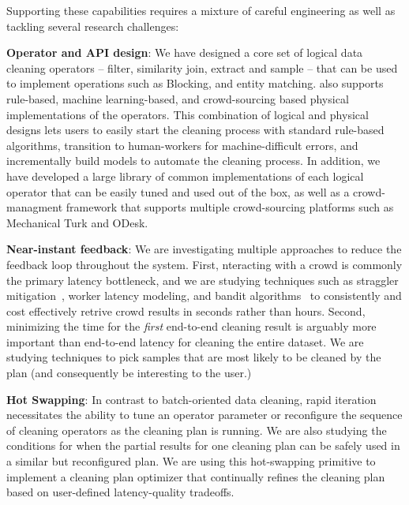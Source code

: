 Supporting these capabilities requires a mixture of careful engineering 
as well as tackling several research challenges:

\squishlist
\item {\bf Operator and API design}: We have designed a core set of logical data cleaning operators --
filter, similarity join, extract and sample -- that can be used to
implement operations such as Blocking, and entity matching.  \sys also supports
rule-based, machine learning-based, and crowd-sourcing based physical implementations of the operators.  
This combination of logical and physical designs lets users to easily start the cleaning process
with standard rule-based algorithms, transition to human-workers for machine-difficult 
errors, and incrementally build models to automate the cleaning process.  
In addition, we have developed a large library of common implementations of 
each logical operator that can be easily tuned and used out of the box, as well as a crowd-managment 
framework that supports multiple crowd-sourcing platforms such as Mechanical Turk and ODesk.

\item {\bf Near-instant feedback}: We are investigating multiple approaches to reduce the 
feedback loop throughout the system.  First, nteracting with a crowd is commonly the primary latency bottleneck,
and we are studying techniques such as straggler mitigation~\cite{venkataraman2014power}, worker latency modeling, and
bandit algorithms~\cite{} to consistently and cost effectively retrive crowd results in seconds rather than hours. 
Second, minimizing the time for the {\it first} end-to-end cleaning result is arguably more important than 
end-to-end latency for cleaning the entire dataset.    We are studying techniques to pick samples that are
most likely to be cleaned by the plan (and consequently be interesting to the user.)

\item {\bf Hot Swapping}: In contrast to batch-oriented data cleaning, rapid iteration necessitates the
ability to tune an operator parameter or reconfigure the sequence of cleaning operators as the cleaning
plan is running.   We are also studying the conditions for when the partial results for one
cleaning plan can be safely used in a similar but reconfigured plan.  We are using this hot-swapping primitive
to implement a cleaning plan optimizer that continually refines the cleaning plan based on user-defined latency-quality
tradeoffs.

